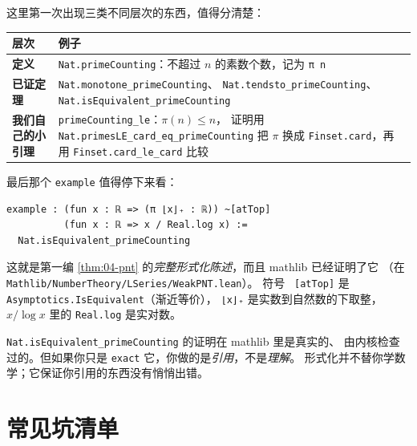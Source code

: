 
这里第一次出现三类不同层次的东西，值得分清楚：

\begin{center}\small
\begin{tabular}{@{}p{}p{}@{}}
\toprule
\textbf{层次} & \textbf{例子}\\
\midrule
\textbf{定义} & \texttt{Nat.primeCounting}：不超过 $n$ 的素数个数，记为 \texttt{π n}\\
\textbf{已证定理} & \texttt{Nat.monotone\_primeCounting}、
  \texttt{Nat.tendsto\_primeCounting}、\texttt{Nat.isEquivalent\_primeCounting}\\
\textbf{我们自己的小引理} & \texttt{primeCounting\_le}：$\pi(n)\le n$，
  证明用 \texttt{Nat.primesLE\_card\_eq\_primeCounting} 把 $\pi$ 换成
  \texttt{Finset.card}，再用 \texttt{Finset.card\_le\_card} 比较\\
\bottomrule
\end{tabular}
\end{center}

最后那个 \texttt{example} 值得停下来看：

\begin{lstlisting}[language=Lean,numbers=none,frame=none,xleftmargin=0pt]
example : (fun x : ℝ => (π ⌊x⌋₊ : ℝ)) ~[atTop]
          (fun x : ℝ => x / Real.log x) :=
  Nat.isEquivalent_primeCounting
\end{lstlisting}

这就是第一编 \cref{thm:04-pnt} 的\emph{完整形式化陈述}，而且 mathlib 已经证明了它
（在 \texttt{Mathlib/NumberTheory/LSeries/WeakPNT.lean}）。
符号 \texttt{~[atTop]} 是 \texttt{Asymptotics.IsEquivalent}（渐近等价），
\texttt{⌊x⌋₊} 是实数到自然数的下取整，$x/\log x$ 里的 \texttt{Real.log} 是实对数。

\begin{histbox}[一个好问题：这算"证明"了吗？]
\texttt{Nat.isEquivalent\_primeCounting} 的证明在 mathlib 里是真实的、
由内核检查过的。但如果你只是 \texttt{exact} 它，你做的是\emph{引用}，不是\emph{理解}。
形式化并不替你学数学；它保证你引用的东西没有悄悄出错。
\end{histbox}

\section{常见坑清单}
\label{sec:07-pitfalls}

